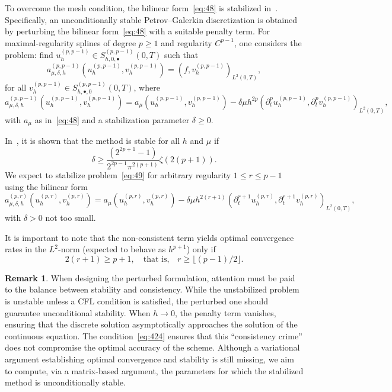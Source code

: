 \documentclass[addpoints,12pt,letter]{article}
\newcommand{\de}{\delta}
\newcommand{\ze}{\zeta}
\newcommand{\TF}{T}
\renewcommand{\ge}{\geqslant}
\renewcommand{\le}{\leqslant}
\numberwithin{equation}{section}
\theoremstyle{definition}
\newtheorem{remark}[lemma]{Remark}
\begin{document}
To overcome the mesh condition, the bilinear form~\eqref{eq:48} is stabilized in~\cite{FrLo23,StZa19}.
Specifically, an unconditionally stable Petrov--Galerkin discretization is obtained by perturbing the bilinear form~\eqref{eq:48} with a suitable penalty term.
For maximal-regularity splines of degree $p\ge 1$ and regularity $C^{p-1}$, one considers the problem: find $u_{h}^{(p,p-1)}\in S_{h,0,\bullet}^{(p,p-1)}(0,\TF)$ such that
\[
a^{(p,p-1)}_{\mu,\de,h}(u_{h}^{(p,p-1)},v_{h}^{(p,p-1)})=(f, v_{h}^{(p,p-1)})_{L^{2}(0,\TF)},
\]
for all $v_{h}^{(p,p-1)}\in S_{h,\bullet,0}^{(p,p-1)}(0,\TF)$, where
\[
a^{(p,p-1)}_{\mu,\de,h}(u_{h}^{(p,p-1)},v_{h}^{(p,p-1)})
=a_{\mu}(u_{h}^{(p,p-1)},v_{h}^{(p,p-1)})
-\de\mu h^{2p} (\partial_{t}^{p} u_{h}^{(p,p-1)},\partial_{t}^{p} v_{h}^{(p,p-1)})_{L^{2}(0,\TF )},
\]
with $a_{\mu}$ as in~\eqref{eq:48} and a stabilization parameter $\de\ge 0$.

In~\cite{FeFr26}, it is shown that the method is stable for all $h$ and $\mu$ if
\begin{equation} \label{delta}
\de\ge\frac{(2^{2p+1}-1)}{2^{2p-1}\pi^{2(p+1)}}\ze(2(p+1)).
\end{equation}
We expect to stabilize problem~\eqref{eq:49} for arbitrary regularity $1\le r\le p-1$ using the bilinear form
\[
a_{\mu,\de,h}^{(p,r)}(u_{h}^{(p,r)},v_{h}^{(p,r)})
=a_{\mu}(u_{h}^{(p,r)},v_{h}^{(p,r)})
-\de\mu h^{2(r+1)} (\partial_{t}^{r+1} u_{h}^{(p,r)},\partial_{t}^{r+1} v_{h}^{(p,r)})_{L^{2}(0,\TF)},
\]
with $\de>0$ not too small.

It is important to note that the non-consistent term yields optimal convergence rates in the $L^{2}$-norm (expected to behave as $h^{p+1}$) only if
\begin{equation}\label{eq:424}
2(r+1)\ge p+1,\quad\text{that is,}\quad r\ge\lfloor (p-1)/2\rfloor.
\end{equation}

\begin{remark}
	When designing the perturbed formulation, attention must be paid to the balance between stability and consistency.
While the unstabilized problem is unstable unless a CFL condition is satisfied, the perturbed one should guarantee unconditional stability.
When $h\to 0$, the penalty term vanishes, ensuring that the discrete solution asymptotically approaches the solution of the continuous equation.
The condition~\eqref{eq:424} ensures that this ``consistency crime'' does not compromise the optimal accuracy of the scheme.
Although a variational argument establishing optimal convergence and stability is still missing, we aim to compute, via a matrix-based argument, the parameters for which the stabilized method is unconditionally stable.
\end{remark}
\end{document}
